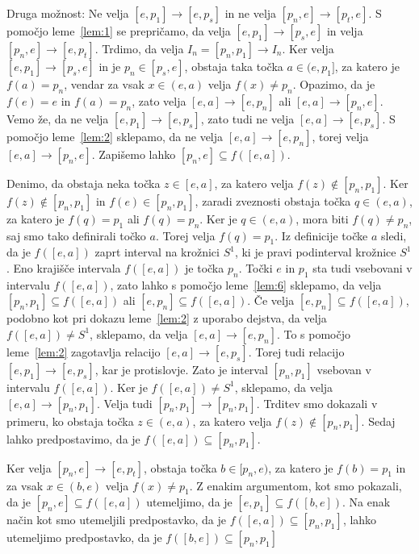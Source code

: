 \documentclass[../TG_magistrsko_delo_sections.tex]{subfiles}
\begin{document}
\begin{dokaz}
Druga možnost:
Ne velja $[e, p_1] \to [e, p_s]$ in ne velja $[p_n, e] \to [p_t, e]$. S pomočjo leme~\ref{lem:1} se prepričamo, da velja $[e, p_1] \to [p_s, e]$ in velja $[p_n, e] \to [e, p_t]$. Trdimo, da velja $I_n = [p_n, p_1] \to I_n$. Ker velja $[e, p_1] \to [p_s, e]$ in je $p_n \in [p_s, e]$, obstaja taka točka $a \in (e, p_1]$, za katero je $f(a) = p_n$, vendar za vsak $x \in (e, a)$ velja $f(x) \neq p_n$. Opazimo, da je $f(e) = e$ in $f(a) = p_n$, zato velja $[e, a] \to [e, p_n]$ ali $[e, a] \to [p_n, e]$. Vemo že, da ne velja $[e, p_1] \to [e, p_s]$, zato tudi ne velja $[e, a] \to [e, p_s]$. S pomočjo leme~\ref{lem:2} sklepamo, da ne velja $[e, a] \to [e, p_n]$, torej velja $[e, a] \to [p_n, e]$. Zapišemo lahko $[p_n, e] \subseteq f([e, a])$.

Denimo, da obstaja neka točka $z \in [e, a]$, za katero velja $f(z) \notin [p_n, p_1]$. Ker $f(z) \notin [p_n, p_1]$ in $f(e) \in [p_n, p_1]$, zaradi zveznosti obstaja točka $q \in (e, a)$, za katero je $f(q) = p_1$ ali $f(q)=p_n$. Ker je $q \in (e, a)$, mora biti $f(q) \neq p_n$, saj smo tako definirali točko $a$. Torej velja $f(q) = p_1$. Iz definicije točke $a$ sledi, da je $f([e, a])$ zaprt interval na krožnici $S^1$, ki je pravi podinterval krožnice $S^1$. Eno krajišče intervala $f([e, a])$ je točka $p_n$. Točki $e$ in $p_1$ sta tudi vsebovani v intervalu $f([e, a])$, zato lahko s pomočjo leme~\ref{lem:6} sklepamo, da velja $[p_n, p_1] \subseteq f([e, a])$ ali $[e, p_n] \subseteq f([e, a])$. Če velja $[e, p_n] \subseteq f([e, a])$, podobno kot pri dokazu leme~\ref{lem:2} z uporabo dejstva, da velja $f([e, a]) \neq S^1$, sklepamo, da velja $[e, a] \to [e, p_n]$. To s pomočjo leme~\ref{lem:2} zagotavlja relacijo $[e, a] \to [e, p_s]$. Torej tudi relacijo $[e, p_1] \to [e, p_s]$, kar je protislovje. Zato je interval $[p_n, p_1]$ vsebovan v intervalu $f([e, a])$. Ker je $f([e, a]) \neq S^1$, sklepamo, da velja $[e, a] \to [p_n, p_1]$. Velja tudi $[p_n, p_1] \to [p_n, p_1]$.
Trditev smo dokazali v primeru, ko obstaja točka $z \in (e, a)$, za katero velja $f(z) \notin [p_n, p_1]$. Sedaj lahko predpostavimo, da je $f([e, a]) \subseteq [p_n, p_1]$. 

Ker velja $[p_n, e] \to [e, p_t]$, obstaja točka $b \in [p_n, e)$, za katero je $f(b)=p_1$ in za vsak $x \in (b, e)$ velja $f(x) \neq p_1$. Z enakim argumentom, kot smo pokazali, da je $[p_n, e] \subseteq f([e, a])$ utemeljimo, da je $[e, p_1] \subseteq f([b, e])$. Na enak način kot smo utemeljili predpostavko, da je $f([e, a]) \subseteq [p_n, p_1]$, lahko utemeljimo predpostavko, da je $f([b, e]) \subseteq [p_n, p_1]$


\end{dokaz}
\end{document}
